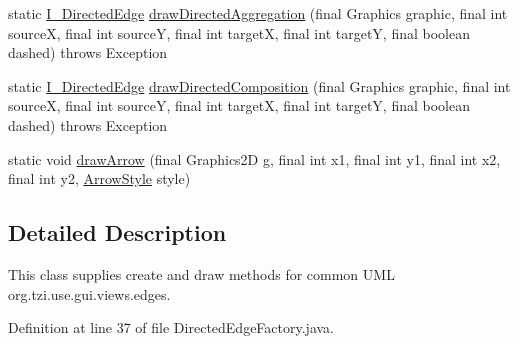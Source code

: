 \begin{DoxyCompactItemize}
\item 
static \hyperlink{interfaceorg_1_1tzi_1_1use_1_1gui_1_1views_1_1diagrams_1_1edges_1_1_i___directed_edge}{I\-\_\-\-Directed\-Edge} \hyperlink{classorg_1_1tzi_1_1use_1_1gui_1_1views_1_1diagrams_1_1edges_1_1_directed_edge_factory_a01f145f730530adc26ff49089e637c8b}{draw\-Directed\-Aggregation} (final Graphics graphic, final int source\-X, final int source\-Y, final int target\-X, final int target\-Y, final boolean dashed)  throws Exception 
\item 
static \hyperlink{interfaceorg_1_1tzi_1_1use_1_1gui_1_1views_1_1diagrams_1_1edges_1_1_i___directed_edge}{I\-\_\-\-Directed\-Edge} \hyperlink{classorg_1_1tzi_1_1use_1_1gui_1_1views_1_1diagrams_1_1edges_1_1_directed_edge_factory_a8f5f0a3e70fe71ccea8bcd1b11cdab7d}{draw\-Directed\-Composition} (final Graphics graphic, final int source\-X, final int source\-Y, final int target\-X, final int target\-Y, final boolean dashed)  throws Exception 
\item 
static void \hyperlink{classorg_1_1tzi_1_1use_1_1gui_1_1views_1_1diagrams_1_1edges_1_1_directed_edge_factory_a66930ea2ed72cf1cb9ab5740190322e9}{draw\-Arrow} (final Graphics2\-D g, final int x1, final int y1, final int x2, final int y2, \hyperlink{enumorg_1_1tzi_1_1use_1_1gui_1_1views_1_1diagrams_1_1edges_1_1_directed_edge_factory_1_1_arrow_style}{Arrow\-Style} style)
\end{DoxyCompactItemize}


\subsection{Detailed Description}
This class supplies create and draw methods for common U\-M\-L org.\-tzi.\-use.\-gui.\-views.\-edges. 

Definition at line 37 of file Directed\-Edge\-Factory.\-java.




